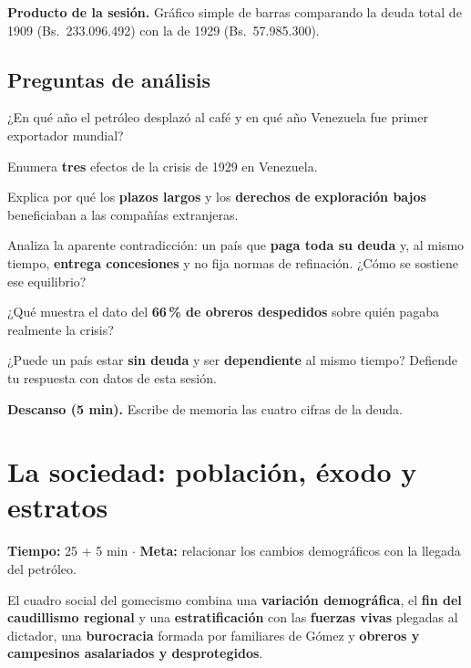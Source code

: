 \documentclass[12pt, letterpaper]{article}
\makeatletter
\let\mw@oldsection\section
\newcommand{\mw@prepage}{%
  \par
  \ifdim\pagegoal=\maxdimen\else
    \ifdim\dimexpr\pagegoal-\pagetotal\relax<7cm\relax
      \newpage
    \fi
  \fi}
\renewcommand{\section}{\mw@prepage\mw@oldsection}
\newcommand{\metasesion}[2]{%
  \begin{cabecerasesion}
    \small
    \textbf{\color{mwprimario}Tiempo:} #1 \quad$\cdot$\quad
    \textbf{\color{mwprimario}Meta:} #2
  \end{cabecerasesion}%
}
\newcommand{\pausa}[1]{%
  \begin{descanso}
    \small\textbf{\color{mwnaranja}Descanso (5 min).} #1
  \end{descanso}%
}
\makeatother
\begin{document}
\begin{cuadropasos}
  \small
  \textbf{Producto de la sesión.} Gráfico simple de barras comparando la deuda
  total de 1909 (Bs.\ 233.096.492) con la de 1929 (Bs.\ 57.985.300).
\end{cuadropasos}

\subsection*{Preguntas de análisis}
\begin{preguntas}
  \item \facil{} ¿En qué año el petróleo desplazó al café y en qué año Venezuela
        fue primer exportador mundial?
  \item \facil{} Enumera \textbf{tres} efectos de la crisis de 1929 en Venezuela.
  \item \medio{} Explica por qué los \textbf{plazos largos} y los
        \textbf{derechos de exploración bajos} beneficiaban a las compañías
        extranjeras.
  \item \dificil{} Analiza la aparente contradicción: un país que \textbf{paga
        toda su deuda} y, al mismo tiempo, \textbf{entrega concesiones} y no fija
        normas de refinación. ¿Cómo se sostiene ese equilibrio?
  \item \dificil{} ¿Qué muestra el dato del \textbf{66\,\% de obreros
        despedidos} sobre quién pagaba realmente la crisis?
  \item \muyDificil{} ¿Puede un país estar \textbf{sin deuda} y ser
        \textbf{dependiente} al mismo tiempo? Defiende tu respuesta con datos de
        esta sesión.
\end{preguntas}

\pausa{Escribe de memoria las cuatro cifras de la deuda.}

\section{La sociedad: población, éxodo y estratos}

\metasesion{25 + 5 min}{relacionar los cambios demográficos con la llegada del
petróleo.}

El cuadro social del gomecismo combina una \textbf{variación demográfica}, el
\textbf{fin del caudillismo regional} y una \textbf{estratificación} con las
\textbf{fuerzas vivas} plegadas al dictador, una \textbf{burocracia} formada por
familiares de Gómez y \textbf{obreros y campesinos asalariados y desprotegidos}.
\end{document}
